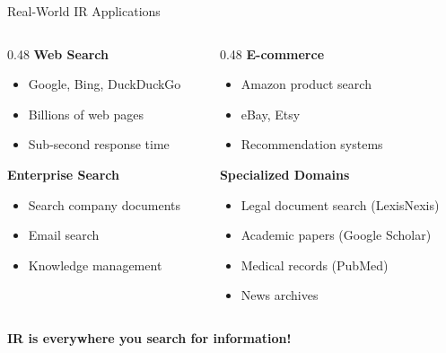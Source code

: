 \documentclass[aspectratio=169]{beamer}
\newif\ifanimated
\newcommand{\cpause}{\ifanimated\pause\fi}
\begin{document}
\begin{frame}{Real-World IR Applications}
\begin{columns}
\begin{column}{0.48\textwidth}
\textbf{Web Search}
\begin{itemize}
    \item Google, Bing, DuckDuckGo
    \item Billions of web pages
    \item Sub-second response time
\end{itemize}
\cpause
\vspace{1em}

\textbf{Enterprise Search}
\begin{itemize}
    \item Search company documents
    \item Email search
    \item Knowledge management
\end{itemize}
\cpause
\end{column}

\begin{column}{0.48\textwidth}
\textbf{E-commerce}
\begin{itemize}
    \item Amazon product search
    \item eBay, Etsy
    \item Recommendation systems
\end{itemize}
\cpause
\vspace{1em}

\textbf{Specialized Domains}
\begin{itemize}
    \item Legal document search (LexisNexis)
    \item Academic papers (Google Scholar)
    \item Medical records (PubMed)
    \item News archives
\end{itemize}
\end{column}
\end{columns}

\vspace{1em}

\begin{center}
\textbf{IR is everywhere you search for information!}
\end{center}
\end{frame}

\end{document}
